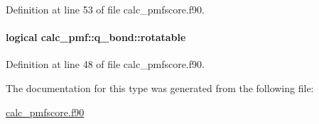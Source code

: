 Definition at line 53 of file calc\-\_\-pmfscore.\-f90.

\hypertarget{structcalc__pmf_1_1q__bond_a074eb11d621c4b3843ae45a415e7d876}{
\paragraph[{rotatable}]{\setlength{\rightskip}{0pt plus 5cm}logical calc\-\_\-pmf\-::q\-\_\-bond\-::rotatable}}\label{structcalc__pmf_1_1q__bond_a074eb11d621c4b3843ae45a415e7d876}


Definition at line 48 of file calc\-\_\-pmfscore.\-f90.



The documentation for this type was generated from the following file\-:\begin{DoxyCompactItemize}
\item 
\hyperlink{calc__pmfscore_8f90}{calc\-\_\-pmfscore.\-f90}\end{DoxyCompactItemize}

